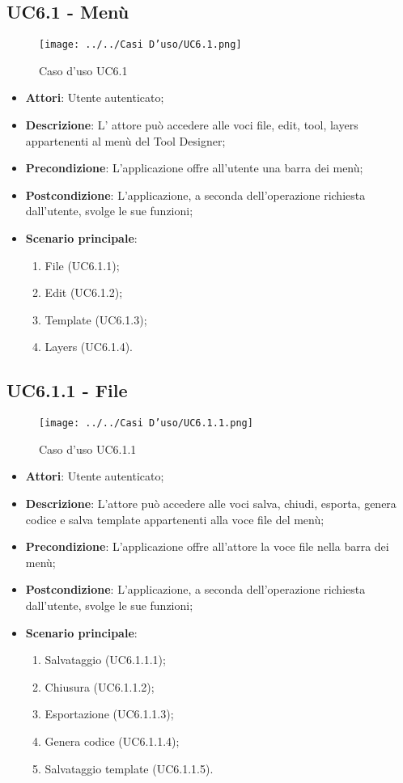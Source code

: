 \subsection{UC6.1 - Menù} 
\label{ssec:UC6.1} 
\begin{figure}[h!] 
\centering 
\texttt{[image: ../../Casi D'uso/UC6.1.png]} 
\caption{Caso d'uso UC6.1} 
 \end{figure} 
\begin{itemize} 
\item \textbf{Attori}: Utente autenticato;
\item \textbf{Descrizione}: L’ attore può accedere alle voci file, edit, tool,
layers appartenenti al menù del Tool Designer;
\item \textbf{Precondizione}: L’applicazione offre all’utente una barra dei menù;
\item \textbf{Postcondizione}: L’applicazione, a seconda dell’operazione richiesta dall’utente,
svolge le sue funzioni;
\item \textbf{Scenario principale}: \begin{enumerate}\item File (UC6.1.1);\item Edit (UC6.1.2);\item Template (UC6.1.3);\item Layers (UC6.1.4). 
 \end{enumerate}
\end{itemize} 
\newpage
\subsection{UC6.1.1 - File} 
\label{ssec:UC6.1.1} 
\begin{figure}[h!] 
\centering 
\texttt{[image: ../../Casi D'uso/UC6.1.1.png]} 
\caption{Caso d'uso UC6.1.1} 
 \end{figure} 
\begin{itemize} 
\item \textbf{Attori}: Utente autenticato;
\item \textbf{Descrizione}: L’attore può accedere alle voci salva, chiudi, esporta, genera codice e salva template appartenenti alla voce file del menù;
\item \textbf{Precondizione}: L’applicazione offre all’attore la voce file nella barra dei menù;
\item \textbf{Postcondizione}: L’applicazione, a seconda dell’operazione richiesta dall’utente,
svolge le sue funzioni;
\item \textbf{Scenario principale}: \begin{enumerate}\item Salvataggio (UC6.1.1.1);\item Chiusura (UC6.1.1.2);\item Esportazione (UC6.1.1.3);\item Genera codice (UC6.1.1.4);\item Salvataggio template (UC6.1.1.5). 
 \end{enumerate}
\end{itemize} 
\newpage
